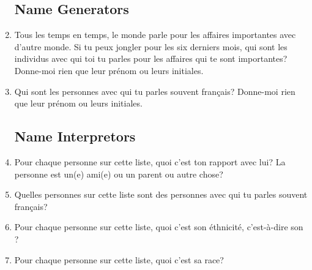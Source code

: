   \begin{enumerate}
  \subsection{Name Generators}
    \item Tous les temps en temps, le monde parle pour les affaires importantes avec d'autre monde. Si tu peux jongler pour les six derniers mois, qui sont les individus avec qui toi tu parles pour les affaires qui te sont importantes? Donne-moi rien que leur prénom ou leurs initiales.\\
    \item Qui sont les personnes avec qui tu parles souvent français? Donne-moi rien que leur prénom ou leurs initiales.\\
  \subsection{Name Interpretors}
    \item Pour chaque personne sur cette liste, quoi c'est ton rapport avec lui? La personne est un(e) ami(e) ou un parent ou autre chose?\\
    \item Quelles personnes sur cette liste sont des personnes avec qui tu parles souvent français?\\
    \item Pour chaque personne sur cette liste, quoi c'est son éthnicité, c'est-à-dire son ?\\
    \item Pour chaque personne sur cette liste, quoi c'est sa race?\\
  \end{enumerate}


